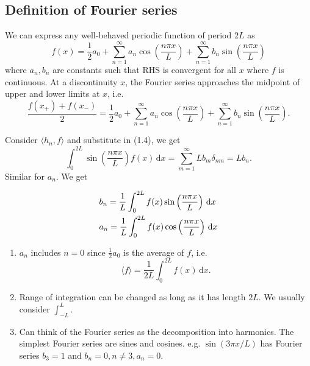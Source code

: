 \documentclass[a4paper]{article}
\begin{document}
\subsection{Definition of Fourier series}
\begin{definition}
    We can express any well-behaved periodic function of period $2L$ as 
\begin{equation}\label{1.eq.4:FS}
    f(x) = \frac{1}{2}a_0 + \sum_{n=1}^{\infty} a_n \cos \left( \frac{n\pi x}{L} \right)+ \sum_{n=1}^{\infty} b_n \sin \left( \frac{n\pi x}{L} \right)
\end{equation}
where $a_n,b_n$ are constants such that RHS is convergent for all $x$ where $f$ is continuous. At a discontinuity $x$, the Fourier series approaches the midpoint of upper and lower limits at $x$, i.e. 
\[
    \frac{f(x_+)+f(x_-)}{2} = \frac{1}{2}a_0 + \sum_{n=1}^{\infty} a_n \cos \left( \frac{n\pi x}{L} \right)+ \sum_{n=1}^{\infty} b_n \sin \left( \frac{n\pi x}{L} \right).
\]
\end{definition}
Consider $ \langle h_n,f \rangle  $ and substitute in (1.4), we get 
\[
    \int_{0}^{2L} \sin \left( \frac{n \pi x}{L} \right) f(x) \,\mathrm{d}x = \sum_{m=1}^{\infty}Lb_m \delta_{nm} = Lb_n.
\]
Similar for $a_n$. We get
\begin{proposition}
    \begin{equation}
        \begin{aligned}
            &b_{n}=\frac{1}{L} \int_{0}^{2 L} f(x) \sin \left(\frac{n \pi x}{L}\right)\, \mathrm{d} x\\ &a_n = \frac{1}{L}\int_{0}^{2L} f(x) \cos \left( \frac{n \pi x}{L} \right) \,\mathrm{d}x
        \end{aligned}
    \end{equation}
\end{proposition}
\begin{note}
    \begin{enumerate}
        \item $a_n$ includes $n=0$ since $ \frac{1}{2}a_0 $ is the average of $f$, i.e.
        \[
            \langle f \rangle = \frac{1}{2L}\int_{0}^{2L} f(x) \,\mathrm{d}x.
        \]
        \item Range of integration can be changed as long as it has length $2L$. We usually consider $ \int_{-L}^{L} $.
        \item Can think of the Fourier series as the decomposition into harmonics. The simplest Fourier series are sines and cosines. e.g. $ \sin (3 \pi x/ L) $ has Fourier series $b_3=1$ and $ b_n=0,n\neq 3 ,a_n=0$.
    \end{enumerate}
\end{note}
\end{document}
